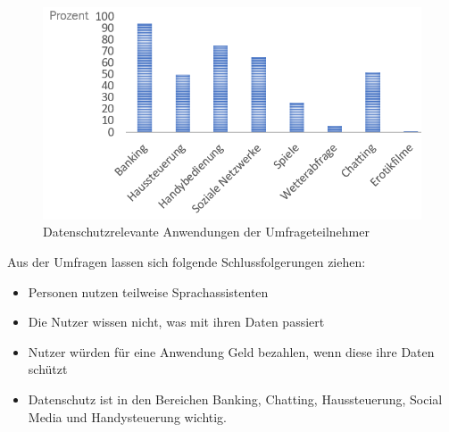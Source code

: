 \begin{figure}[h]
	\centering
	\includegraphics[width=0.9\linewidth]{Picture/umfrage_anwendung}
	\caption[Datenschutzrelevante Anwendungen der Umfrageteilnehmers]{Datenschutzrelevante Anwendungen der Umfrageteilnehmer}
	\label{fig:umfrage_anwendung}
\end{figure}

Aus der Umfragen lassen sich folgende Schlussfolgerungen ziehen:
\begin{itemize}	
	\item Personen nutzen teilweise Sprachassistenten
	\item Die Nutzer wissen nicht, was mit ihren Daten passiert
	\item Nutzer würden für eine Anwendung Geld bezahlen, wenn diese ihre Daten schützt
	\item Datenschutz ist in den Bereichen Banking, Chatting, Haussteuerung, Social Media und Handysteuerung wichtig.
\end{itemize}
